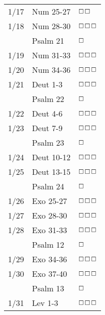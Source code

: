 \documentclass[10pt,landscape,letterpaper]{article}
\begin{document}
\begin{multicols}{5}
\begin{tabular}{p{0.15in}p{0.7in}p{0.5in}}
1/17 & Num 25-27 & $\boxempty$$\boxempty$ \\
1/18 & Num 28-30 & $\boxempty$$\boxempty$$\boxempty$ \\
 & \textcolor[rgb]{0.98,0.00,0.00}{Psalm 21} & \textcolor[rgb]{1.00,0.00,0.00}{$\boxempty$} \\
1/19 & Num 31-33 & $\boxempty$$\boxempty$$\boxempty$ \\
1/20 & Num 34-36 & $\boxempty$$\boxempty$$\boxempty$ \\
1/21 & Deut 1-3 & $\boxempty$$\boxempty$$\boxempty$ \\
 & \textcolor[rgb]{0.98,0.00,0.00}{Psalm 22} & \textcolor[rgb]{1.00,0.00,0.00}{$\boxempty$} \\
1/22 & Deut 4-6 & $\boxempty$$\boxempty$$\boxempty$ \\
1/23 & Deut 7-9 & $\boxempty$$\boxempty$$\boxempty$ \\
 & \textcolor[rgb]{0.98,0.00,0.00}{Psalm 23} & \textcolor[rgb]{1.00,0.00,0.00}{$\boxempty$} \\
1/24 & Deut 10-12 & $\boxempty$$\boxempty$$\boxempty$ \\
1/25 & Deut 13-15 & $\boxempty$$\boxempty$$\boxempty$ \\
 & \textcolor[rgb]{0.98,0.00,0.00}{Psalm 24} & \textcolor[rgb]{1.00,0.00,0.00}{$\boxempty$} \\
1/26 & Exo 25-27 & $\boxempty$$\boxempty$$\boxempty$ \\
1/27 & Exo 28-30 & $\boxempty$$\boxempty$$\boxempty$ \\
1/28 & Exo 31-33 & $\boxempty$$\boxempty$$\boxempty$ \\
 & \textcolor[rgb]{0.98,0.00,0.00}{Psalm 12} & \textcolor[rgb]{1.00,0.00,0.00}{$\boxempty$} \\
1/29 & Exo 34-36 & $\boxempty$$\boxempty$$\boxempty$ \\
1/30 & Exo 37-40 & $\boxempty$$\boxempty$$\boxempty$ \\
 & \textcolor[rgb]{0.98,0.00,0.00}{Psalm 13} & \textcolor[rgb]{1.00,0.00,0.00}{$\boxempty$} \\
1/31 & Lev 1-3 & $\boxempty$$\boxempty$$\boxempty$ \\
 \end{tabular}


\end{multicols}
\end{document}
